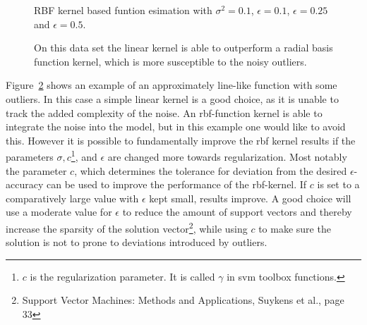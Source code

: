 \begin{figure}
\centering



\caption{RBF kernel based funtion esimation with $\sigma^2 = 0.1$, $\epsilon = 0.1$, $\epsilon = 0.25$ and $\epsilon = 0.5$.}
\label{fig:ebfEstEps}
\end{figure}
\begin{figure}
\centering


\caption{On this data set the linear kernel is able to outperform a radial basis function kernel, which is more susceptible to the noisy outliers.}
\label{fig:linearKing}
\end{figure}
Figure~\ref{fig:linearKing} shows an example of an approximately line-like function with some outliers. In this case a simple linear kernel is a good choice, as it is unable to track the added complexity of the noise. An rbf-function kernel is able to integrate the noise into the model, but in this example one would like to avoid this. However it is possible to fundamentally improve the rbf kernel results if the parameters $\sigma, c$\footnote{$c$ is the regularization parameter. It is called $\gamma$ in svm toolbox functions.}, and $\epsilon$ are changed more towards regularization. Most notably the parameter $c$, which determines the tolerance for deviation from the desired $\epsilon$-accuracy can be used to improve the performance of the rbf-kernel. If $c$ is set to a comparatively large value with $\epsilon$ kept small, results improve. A good choice will use a moderate value for $\epsilon$ to reduce the amount of support vectors and thereby increase the sparsity of the solution vector\footnote{Support Vector Machines: Methods and Applications, Suykens et al., page 33}, while using $c$ to make sure the solution is not to prone to deviations introduced by outliers.
 

